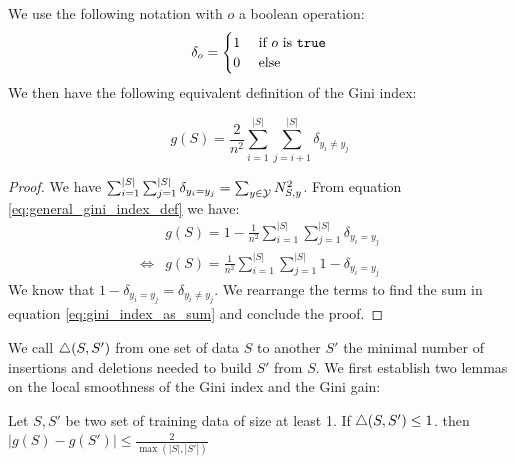 We use the following notation with $o$ a boolean operation:
\begin{equation}
    \delta_o = \begin{cases}
        1 & \text{ if $o$ is \texttt{true}}\\
        0 & \text{ else}
    \end{cases}
\end{equation}
We then have the following equivalent definition of the Gini index:
\begin{property}
    \begin{equation}\label{eq:gini_index_as_sum}
        g(S) = \frac{2}{n^2} \sum_{i=1}^{|S|}\sum_{j=i+1}^{|S|} \delta_{y_i \neq y_j}
    \end{equation}
\end{property}
\begin{proof}
    We have $\sum_{i=1}^{|S|}\sum_{j=1}^{|S|} \delta_{y_i = y_j} = \sum_{y \in \mathcal{Y}} N_{S,y}^2$. From equation \ref{eq:general_gini_index_def} we have:
    \begin{equation*}
        \begin{split}
            & g(S) = 1 - \frac{1}{n^2} \sum_{i=1}^{|S|}\sum_{j=1}^{|S|} \delta_{y_i = y_j}\\
            \Leftrightarrow & g(S) = \frac{1}{n^2} \sum_{i=1}^{|S|}\sum_{j=1}^{|S|} 1 - \delta_{y_i = y_j}
        \end{split}
    \end{equation*}
    We know that $1 - \delta_{y_i = y_j} = \delta_{y_i \neq y_j}$. We rearrange the terms to find the sum in equation \ref{eq:gini_index_as_sum} and conclude the proof.
\end{proof}

We call  $\triangle(S, S')$ from one set of data $S$ to another $S'$ the minimal number of insertions and deletions needed to build $S'$ from $S$. We first establish two lemmas on the local smoothness of the Gini index and the Gini gain:
\begin{lemma}\label{lem:local_gini_index_smoothness}
    Let $S, S'$ be two set of training data of size at least 1. If $\triangle(S, S') \leq 1$. then $|g(S) - g(S')| \leq \frac{2}{\max(|S|, |S'|)}$
\end{lemma}


